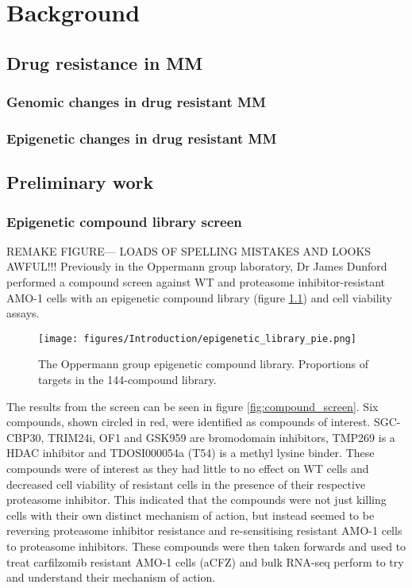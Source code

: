 \chapter{\label{ch:2-litreview}Background}



\section{Drug resistance in MM}


\subsection{Genomic changes in drug resistant MM}


\subsection{Epigenetic changes in drug resistant MM}

\section{Preliminary work}\label{sec:preliminary}
\subsection{Epigenetic compound library screen}
REMAKE FIGURE--- LOADS OF SPELLING MISTAKES AND LOOKS AWFUL!!!
Previously in the Oppermann group laboratory, Dr James Dunford performed a compound screen against WT and proteasome inhibitor-resistant AMO-1 cells with an epigenetic compound library (figure \ref{fig:epigenetic_pie}) and cell viability assays.

\begin{figure}[htb]
\centering\texttt{[image: figures/Introduction/epigenetic\_library\_pie.png]}
\caption[Epigenentic compound library pie chart]{The Oppermann group epigenetic compound library.
Proportions of targets in the 144-compound library. }
\label{fig:epigenetic_pie}
\end{figure}

The results from the screen can be seen in figure \ref{fig:compound_screen}.
Six compounds, shown circled in red, were identified as compounds of interest.
SGC-CBP30, TRIM24i, OF1 and GSK959 are bromodomain inhibitors, TMP269 is a HDAC inhibitor and TDOSI000054a (T54) is a methyl lysine binder.
These compounds were of interest as they had little to no effect on WT cells and decreased cell viability of resistant cells in the presence of their respective proteasome inhibitor.
This indicated that the compounds were not just killing cells with their own distinct mechanism of action, but instead seemed to be reversing proteasome inhibitor resistance and re-sensitising resistant AMO-1 cells to proteasome inhibitors.
These compounds were then taken forwards and used to treat carfilzomib resistant AMO-1 cells (aCFZ) and bulk RNA-seq perform to try and understand their mechanism of action.

